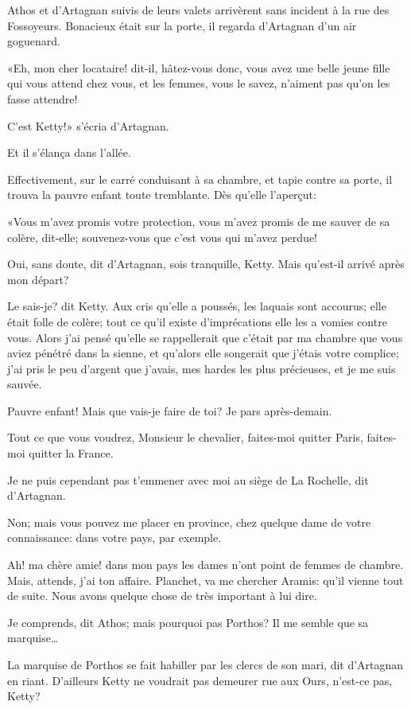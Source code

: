 Athos et d'Artagnan suivis de leurs valets arrivèrent sans incident à la rue des Fossoyeurs. Bonacieux était sur la porte, il regarda d'Artagnan d'un air goguenard. 

«Eh, mon cher locataire! dit-il, hâtez-vous donc, vous avez une belle jeune fille qui vous attend chez vous, et les femmes, vous le savez, n'aiment pas qu'on les fasse attendre! 

\speak  C'est Ketty!» s'écria d'Artagnan. 

Et il s'élança dans l'allée. 

Effectivement, sur le carré conduisant à sa chambre, et tapie contre sa porte, il trouva la pauvre enfant toute tremblante. Dès qu'elle l'aperçut: 

«Vous m'avez promis votre protection, vous m'avez promis de me sauver de sa colère, dit-elle; souvenez-vous que c'est vous qui m'avez perdue! 

\speak  Oui, sans doute, dit d'Artagnan, sois tranquille, Ketty. Mais qu'est-il arrivé après mon départ? 

\speak  Le sais-je? dit Ketty. Aux cris qu'elle a poussés, les laquais sont accourus; elle était folle de colère; tout ce qu'il existe d'imprécations elle les a vomies contre vous. Alors j'ai pensé qu'elle se rappellerait que c'était par ma chambre que vous aviez pénétré dans la sienne, et qu'alors elle songerait que j'étais votre complice; j'ai pris le peu d'argent que j'avais, mes hardes les plus précieuses, et je me suis sauvée. 

\speak  Pauvre enfant! Mais que vais-je faire de toi? Je pars après-demain. 

\speak  Tout ce que vous voudrez, Monsieur le chevalier, faites-moi quitter Paris, faites-moi quitter la France. 

\speak  Je ne puis cependant pas t'emmener avec moi au siège de La Rochelle, dit d'Artagnan. 

\speak  Non; mais vous pouvez me placer en province, chez quelque dame de votre connaissance: dans votre pays, par exemple. 

\speak  Ah! ma chère amie! dans mon pays les dames n'ont point de femmes de chambre. Mais, attends, j'ai ton affaire. Planchet, va me chercher Aramis: qu'il vienne tout de suite. Nous avons quelque chose de très important à lui dire. 

\speak  Je comprends, dit Athos; mais pourquoi pas Porthos? Il me semble que sa marquise\dots 

\speak  La marquise de Porthos se fait habiller par les clercs de son mari, dit d'Artagnan en riant. D'ailleurs Ketty ne voudrait pas demeurer rue aux Ours, n'est-ce pas, Ketty? 

